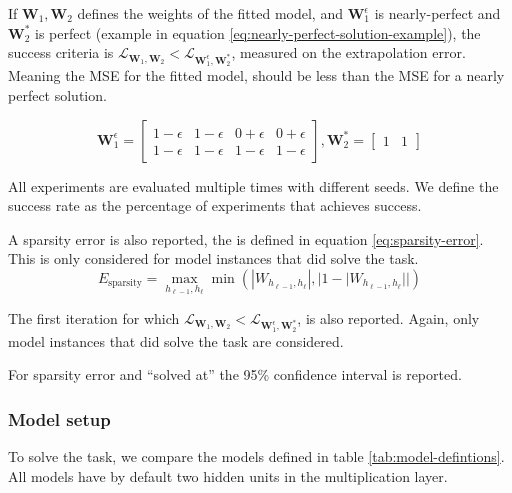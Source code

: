 If $\mathbf{W}_1, \mathbf{W}_2$ defines the weights of the fitted model, and $\mathbf{W}_1^\epsilon$ is nearly-perfect and $\mathbf{W}_2^*$ is perfect (example in equation \ref{eq:nearly-perfect-solution-example}), the success criteria is $\mathcal{L}_{\mathbf{W}_1, \mathbf{W}_2} < \mathcal{L}_{\mathbf{W}_1^\epsilon, \mathbf{W}_2^*}$, measured on the extrapolation error. Meaning the MSE for the fitted model, should be less than the MSE for a nearly perfect solution.

\begin{equation}
    \mathbf{W}_1^\epsilon = \begin{bmatrix}
    1 - \epsilon & 1 - \epsilon & 0 + \epsilon & 0 + \epsilon \\
    1 - \epsilon & 1 - \epsilon & 1 - \epsilon & 1 - \epsilon
    \end{bmatrix}, \mathbf{W}_2^* = \begin{bmatrix}
    1 & 1
    \end{bmatrix}
    \label{eq:nearly-perfect-solution-example}
\end{equation}

All experiments are evaluated multiple times with different seeds. We define the success rate as the percentage of experiments that achieves success.

A sparsity error is also reported, the is defined in equation \ref{eq:sparsity-error}. This is only considered for model instances that did solve the task.
\begin{equation}
E_\mathrm{sparsity} = \max_{h_{\ell-1}, h_{\ell}} \min(|W_{h_{\ell-1},h_\ell}|, |1 - |W_{h_{\ell-1},h_\ell}||)
\label{eq:sparsity-error}
\end{equation}

The first iteration for which $\mathcal{L}_{\mathbf{W}_1, \mathbf{W}_2} < \mathcal{L}_{\mathbf{W}_1^\epsilon, \mathbf{W}_2^*}$, is also reported. Again, only model instances that did solve the task are considered.

For sparsity error and ``solved at'' the 95\% confidence interval is reported.

\subsubsection{Model setup}

To solve the task, we compare the models defined in table \ref{tab:model-defintions}. All models have by default two hidden units in the multiplication layer.

